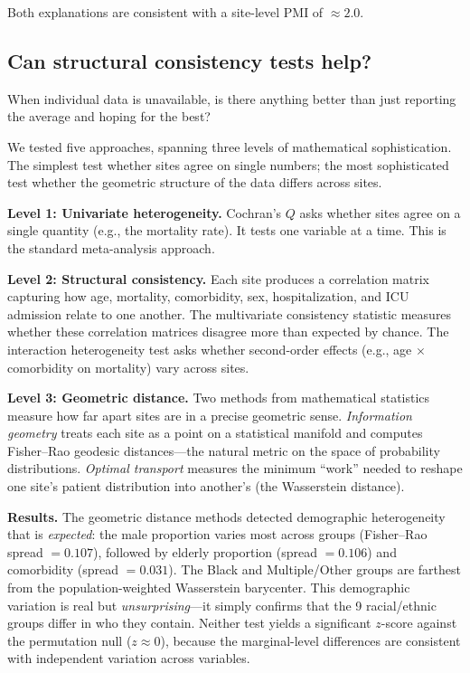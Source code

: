 \documentclass{article}
\begin{document}
Both explanations are consistent with a site-level PMI of $\approx 2.0$.


\subsection{Can structural consistency tests help?}

When individual data is unavailable, is there anything better than
just reporting the average and hoping for the best?

We tested five approaches, spanning three levels of mathematical
sophistication.  The simplest test whether sites agree on single numbers; the
most sophisticated test whether the geometric structure of the data differs
across sites.

\textbf{Level 1: Univariate heterogeneity.}  Cochran's $Q$ asks whether sites
agree on a single quantity (e.g., the mortality rate).  It tests one variable
at a time.  This is the standard meta-analysis approach.

\textbf{Level 2: Structural consistency.}  Each site produces a correlation
matrix capturing how age, mortality, comorbidity, sex, hospitalization, and ICU
admission relate to one another.  The multivariate consistency statistic
measures whether these correlation matrices disagree more than
expected by chance.  The interaction heterogeneity test asks whether
second-order effects (e.g., age $\times$ comorbidity on mortality) vary across
sites.

\textbf{Level 3: Geometric distance.}  Two methods from mathematical
statistics measure how far apart sites are in a precise geometric sense.
\emph{Information geometry} treats each site as a point on a statistical
manifold and computes Fisher--Rao geodesic distances---the natural metric on
the space of probability distributions.  \emph{Optimal transport} measures the
minimum ``work'' needed to reshape one site's patient distribution into
another's (the Wasserstein distance).

\textbf{Results.}  The geometric distance methods detected demographic
heterogeneity that is \emph{expected}: the male proportion varies most across
groups (Fisher--Rao spread $= 0.107$), followed by elderly proportion (spread
$= 0.106$) and comorbidity (spread $= 0.031$).  The Black and Multiple/Other
groups are farthest from the population-weighted Wasserstein barycenter.  This
demographic variation is real but \emph{unsurprising}---it simply confirms that
the 9 racial/ethnic groups differ in who they contain.  Neither test yields a
significant $z$-score against the permutation null ($z \approx 0$), because
the marginal-level differences are consistent with independent variation
across variables.
\end{document}

